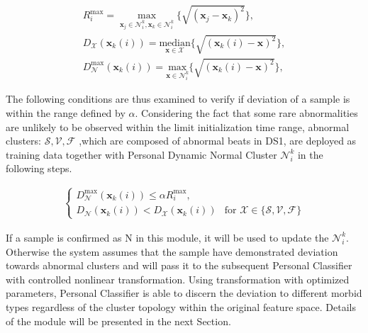 \begin{align}
\label{eq:matrices}
R_i^{\max}=\underset{\mathbf{x}_j\in\mathcal{N}_i^k,\mathbf{x}_k\in\mathcal{N}_i^k}{\max}\{\sqrt{(\mathbf{x}_j-\mathbf{x}_k)^2}\},
\\
D_\mathcal{X}(\mathbf{x}_k(i))=\underset{\mathbf{x} \in\mathcal{X}}{\text{median}}\{\sqrt{(\mathbf{x}_k(i)-\mathbf{x})^2}\},
\\
D_\mathcal{N}^{\max}(\mathbf{x}_k(i))=\underset{\mathbf{x} \in\mathcal{N}_i^k}{\text{max}}\{\sqrt{(\mathbf{x}_k(i)-\mathbf{x})^2}\},
\end{align}

The following conditions are thus examined to verify if deviation of a sample is within the range defined by $\alpha$. Considering the fact that some rare abnormalities are unlikely to be observed within the limit initialization time range, abnormal clusters: ${\mathcal{S},\mathcal{V},\mathcal{F}}$ ,which are composed of abnormal beats in DS1, are deployed as training data together with Personal Dynamic Normal Cluster $\mathcal{N}_i^k$ in the following steps.

\begin{align}\label{eq:condition1}
\begin{cases}
D_\mathcal{N}^{\max}(\mathbf{x}_k(i))  \leq\alpha R_i^{\max},\\
D_\mathcal{N}(\mathbf{x}_k(i)) < D_\mathcal{X}(\mathbf{x}_k(i)) &\text{for~} \mathcal{X}\in\{\mathcal{S},\mathcal{V},\mathcal{F}\}   %
\end{cases}
\end{align}

If a sample is confirmed as N in this module, it will be used to update the $\mathcal{N}_i^k$. Otherwise the system assumes that the sample have demonstrated deviation towards abnormal clusters and will pass it to the subsequent Personal Classifier with controlled nonlinear transformation. Using transformation with optimized parameters, Personal Classifier is able to discern the deviation to different morbid types regardless of the cluster topology within the original feature space. Details of the module will be presented in the next Section.

